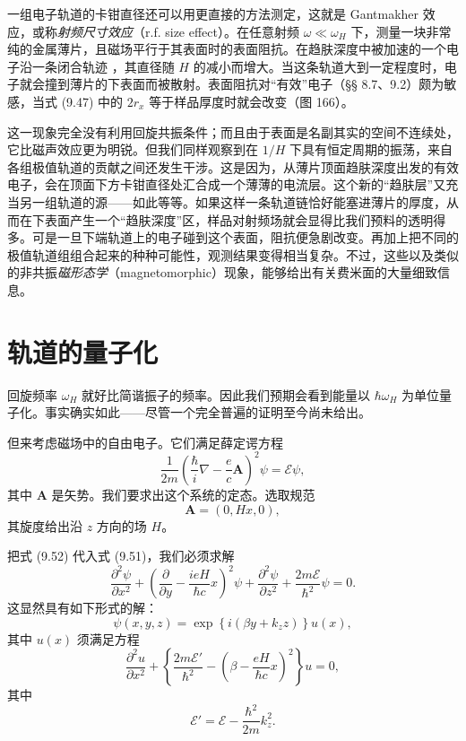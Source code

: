 一组电子轨道的卡钳直径还可以用更直接的方法测定，这就是 Gantmakher 效应，或称\emph{射频尺寸效应}（r.f. size effect）。在任意射频 $\omega\ll\omega_H$ 下，测量一块非常纯的金属薄片，且磁场平行于其表面时的表面阻抗。在趋肤深度中被加速的一个电子沿一条闭合轨迹
，其直径随 $H$ 的减小而增大。当这条轨道大到一定程度时，电子就会撞到薄片的下表面而被散射。表面阻抗对“有效”电子（§§ 8.7、9.2）颇为敏感，当式 (9.47) 中的 $2r_{x}$ 等于样品厚度时就会改变（图 166）。

这一现象完全没有利用回旋共振条件；而且由于表面是名副其实的空间不连续处，它比磁声效应更为明锐。但我们同样观察到在 $1/H$ 下具有恒定周期的振荡，来自各组极值轨道的贡献之间还发生干涉。这是因为，从薄片顶面趋肤深度出发的有效电子，会在顶面下方卡钳直径处汇合成一个薄薄的电流层。这个新的“趋肤层”又充当另一组轨道的源——如此等等。如果这样一条轨道链恰好能塞进薄片的厚度，从而在下表面产生一个“趋肤深度”区，样品对射频场就会显得比我们预料的透明得多。可是一旦下端轨道上的电子碰到这个表面，阻抗便急剧改变。再加上把不同的极值轨道组组合起来的种种可能性，观测结果变得相当复杂。不过，这些以及类似的非共振\emph{磁形态学}（magnetomorphic）现象，能够给出有关费米面的大量细致信息。

\section{轨道的量子化}

回旋频率 $\omega_{H}$ 就好比简谐振子的频率。因此我们预期会看到能量以 $\hbar\omega_{H}$ 为单位量子化。事实确实如此——尽管一个完全普遍的证明至今尚未给出。

但来考虑磁场中的自由电子。它们满足薛定谔方程
\begin{equation*}
\frac{1}{2m}\left(\frac{\hbar}{i}\nabla-\frac{e}{c}\mathbf{A}\right)^{2}\psi=\mathcal{E}\psi,
\tag{9.51}
\end{equation*}
其中 $\mathbf{A}$ 是矢势。我们要求出这个系统的定态。选取规范
\begin{equation*}
\mathbf{A}=(0,Hx,0),
\tag{9.52}
\end{equation*}
其旋度给出沿 $z$ 方向的场 $H$。

把式 (9.52) 代入式 (9.51)，我们必须求解
\begin{equation*}
\frac{\partial^{2}\psi}{\partial x^{2}}+\left(\frac{\partial}{\partial y}-\frac{ieH}{\hbar c}x\right)^{2}\psi+\frac{\partial^{2}\psi}{\partial z^{2}}+\frac{2m\mathcal{E}}{\hbar^{2}}\psi=0.
\tag{9.53}
\end{equation*}
这显然具有如下形式的解：
\begin{equation*}
\psi(x,y,z)=\exp\left\{i(\beta y+k_{z}z)\right\}u(x),
\tag{9.54}
\end{equation*}
其中 $u(x)$ 须满足方程
\begin{equation*}
\frac{\partial^{2}u}{\partial x^{2}}+\left\{\frac{2m\mathcal{E}'}{\hbar^{2}}-\left(\beta-\frac{eH}{\hbar c}x\right)^{2}\right\}u=0,
\tag{9.55}
\end{equation*}
其中
\begin{equation*}
\mathcal{E}'=\mathcal{E}-\frac{\hbar^{2}}{2m}k_{z}^{2}.
\tag{9.56}
\end{equation*}

